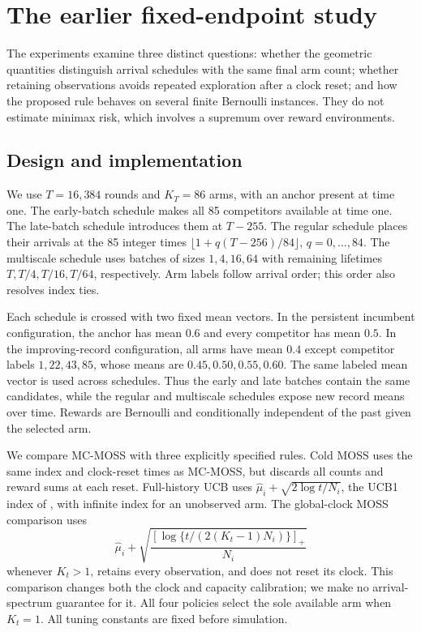\section{The earlier fixed-endpoint study}\label{sec:earlier-experiments}

The experiments examine three distinct questions: whether the geometric
quantities distinguish arrival schedules with the same final arm count;
whether retaining observations avoids repeated exploration after a clock
reset; and how the proposed rule behaves on several finite Bernoulli
instances. They do not estimate minimax risk, which involves a supremum
over reward environments.

\subsection{Design and implementation}

We use $T=16{,}384$ rounds and $K_T=86$ arms, with an anchor present at
time one. The early-batch schedule makes all 85 competitors available at
time one. The late-batch schedule introduces them at $T-255$. The regular
schedule places their arrivals at the 85 integer times
$\lfloor 1+q(T-256)/84\rfloor$, $q=0,\ldots,84$.
The multiscale schedule uses batches of sizes $1,4,16,64$ with remaining
lifetimes $T,T/4,T/16,T/64$, respectively. Arm labels follow arrival
order; this order also resolves index ties.

Each schedule is crossed with two fixed mean vectors. In the persistent
incumbent configuration, the anchor has mean $0.6$ and every competitor
has mean $0.5$. In the improving-record configuration, all arms have
mean $0.4$ except competitor labels $1,22,43,85$, whose means are
$0.45,0.50,0.55,0.60$. The same labeled mean vector is used across
schedules. Thus the early and late batches contain the same candidates,
while the regular and multiscale schedules expose new record means over
time. Rewards are Bernoulli and conditionally independent of the past
given the selected arm.

We compare MC-MOSS with three explicitly specified rules. Cold MOSS
uses the same index and clock-reset times as MC-MOSS, but discards all
counts and reward sums at each reset. Full-history UCB uses
$\widehat\mu_i+\sqrt{2\log t/N_i}$, the UCB1 index of
\citet{auer2002finite}, with infinite index for an unobserved arm.
The global-clock MOSS comparison uses
\[
 \widehat\mu_i+
 \sqrt{\frac{[\log\{t/(2(K_t-1)N_i)\}]_+}{N_i}}
\]
whenever $K_t>1$, retains every observation, and does not reset its
clock. This comparison changes both the clock and capacity calibration; we make
no arrival-spectrum guarantee for it. All four policies select the
sole available arm when $K_t=1$. All tuning constants are fixed before
simulation.

